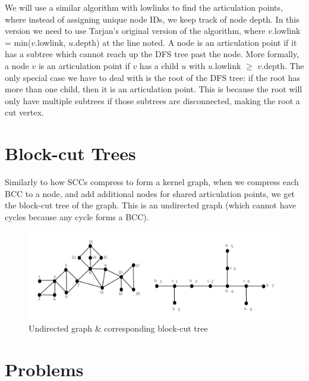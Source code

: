 \documentclass{article}
\begin{document}
We will use a similar algorithm with lowlinks to find the articulation points, where instead of assigning unique node IDs, we keep track of node depth. In this version we need to use Tarjan's original version of the algorithm, where $v$.lowlink = min($v$.lowlink, $u$.depth) at the line noted. A node is an articulation point if it has a subtree which cannot reach up the DFS tree past the node. More formally, a node $v$ is an articulation point if $v$ has a child $u$ with $u$.lowlink $\geq$ $v$.depth. The only special case we have to deal with is the root of the DFS tree: if the root has more than one child, then it is an articulation point. This is because the root will only have multiple subtrees if those subtrees are disconnected, making the root a cut vertex.

\section{Block-cut Trees}

Similarly to how SCCs compress to form a kernel graph, when we compress each BCC to a node, and add additional nodes for shared articulation points, we get the block-cut tree of the graph. This is an undirected graph (which cannot have cycles because any cycle forms a BCC).

\begin{figure}[h]
    \centering
    \includegraphics[scale=0.4]{images/bctree.png}
    \caption{Undirected graph \& corresponding block-cut tree}
    \label{fig:my_label}
\end{figure}

\newpage
\section{Problems}
\end{document}
